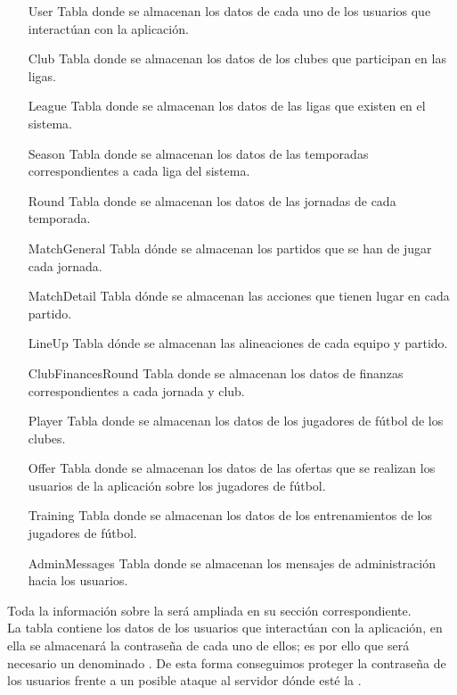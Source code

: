 \begin{itemize}
  \item [User] Tabla donde se almacenan los datos de cada uno de los
    usuarios que interactúan con la aplicación.
  \item [Club] Tabla donde se almacenan los datos de los clubes que
    participan en las ligas.
  \item [League] Tabla donde se almacenan los datos de las ligas que
    existen en el sistema.
  \item  [Season] Tabla donde se almacenan los datos de las temporadas
    correspondientes a cada liga del sistema.
  \item [Round] Tabla donde se almacenan los datos de las jornadas de
    cada temporada.
  \item [MatchGeneral] Tabla dónde se almacenan los partidos que se
    han de jugar cada jornada.
  \item [MatchDetail] Tabla dónde se almacenan las acciones que tienen
    lugar en cada partido.
  \item [LineUp] Tabla dónde se almacenan las alineaciones de cada
    equipo y partido.
  \item [ClubFinancesRound] Tabla donde se almacenan los datos de
    finanzas correspondientes a cada jornada y club.
  \item [Player] Tabla donde se almacenan los datos de los jugadores
    de fútbol de los clubes.
  \item [Offer] Tabla donde se almacenan los datos de las ofertas que
    se realizan los usuarios de la aplicación sobre los jugadores de
    fútbol.
  \item [Training] Tabla donde se almacenan los datos de los
    entrenamientos de los jugadores de fútbol.
  \item [AdminMessages] Tabla donde se almacenan los mensajes de
    administración hacia los usuarios.
\end{itemize}

Toda la información sobre la  será ampliada en
su sección correspondiente.\\

La tabla  contiene los datos de los usuarios que
interactúan con la aplicación, en ella se almacenará la contraseña de
cada uno de ellos; es por ello que será necesario un
 denominado . De esta
forma conseguimos proteger la contraseña de los usuarios frente a un
posible ataque al servidor dónde esté la .\\

